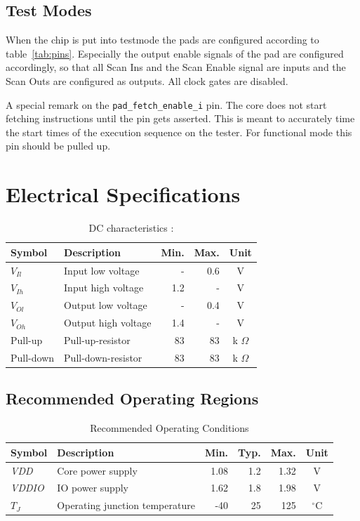 \subsection{Test Modes}
  When the chip is put into testmode the pads are configured according to table~\ref{tab:pins}. Especially the output enable signals of the pad are configured accordingly, so that all Scan Ins and the Scan Enable signal are inputs and the Scan Outs are configured as outputs. All clock gates are disabled. 

  A special remark on the \verb+pad_fetch_enable_i+ pin. The core does not start fetching instructions until the pin gets asserted. This is meant to accurately time the start times of the execution sequence on the tester. For functional mode this pin should be pulled up.

\FloatBarrier

\section{Electrical Specifications}

\begin{table}[htbp]
 \caption[DC characteristics]{DC characteristics \cite{faraday}:} \label{tab:elect_rec}
\centering
\begin{tabularx}{\textwidth}{|l|X|r|r|c|} 
 \hline
  Symbol & Description & Min. & Max. & Unit \\ \hline
  $V_{Il}$ & Input low voltage & - & 0.6 & V \\ \hline
  $V_{Ih}$ & Input high voltage & 1.2 & - & V \\ \hline
  $V_{Ol}$ & Output low voltage & - & 0.4 & V \\ \hline
  $V_{Oh}$ & Output high voltage & 1.4 & - & V \\ \hline
  Pull-up & Pull-up-resistor & 83 & 83 & k $\Omega$ \\ \hline
  Pull-down & Pull-down-resistor & 83 & 83 & k $\Omega$ \\ \hline
 \end{tabularx}
 \end{table}

\subsection{Recommended Operating Regions}
\begin{table}[htbp]
 \caption[Recommended Operating Conditions]{Recommended Operating Conditions \cite{faraday}}
 \label{tab:elect_rec}
\centering\begin{tabularx}{\textwidth}{|l|X|r|r|r|c|} \hline
Symbol & Description & Min. & Typ. & Max. & Unit \\ \hline
\textit{VDD} & Core power supply & 1.08 & 1.2 & 1.32 & V \\ \hline
\textit{VDDIO} & IO power supply & 1.62 & 1.8 & 1.98 & V \\ \hline
$T_J$ & Operating junction temperature & -40 & 25 & 125 &  $^\circ$C \\ \hline
 \end{tabularx}
 \end{table}

